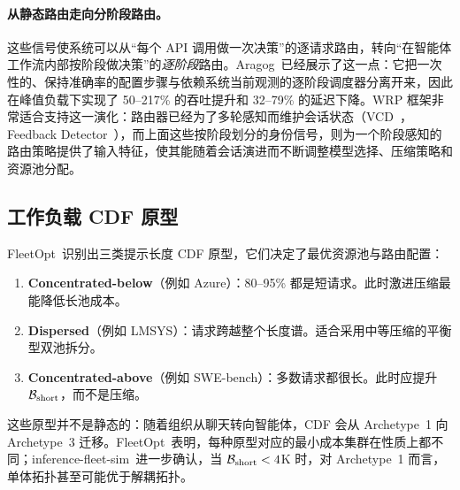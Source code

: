 \paragraph{从静态路由走向分阶段路由。}
这些信号使系统可以从“每个 API 调用做一次决策”的逐请求路由，转向“在智能体工作流内部按阶段做决策”的\emph{逐阶段}路由。Aragog~\cite{aragog2025}已经展示了这一点：它把一次性的、保持准确率的配置步骤与依赖系统当前观测的逐阶段调度器分离开来，因此在峰值负载下实现了 50--217\% 的吞吐提升和 32--79\% 的延迟下降。WRP 框架非常适合支持这一演化：路由器已经为了多轮感知而维护会话状态（VCD~\cite{vcd2026}，Feedback Detector~\cite{feedbackdet2026}），而上面这些按阶段划分的身份信号，则为一个阶段感知的路由策略提供了输入特征，使其能随着会话演进而不断调整模型选择、压缩策略和资源池分配。

\subsection{工作负载 CDF 原型}
\label{sec:workload:archetypes}

FleetOpt~\cite{fleetopt2026}识别出三类提示长度 CDF 原型，它们决定了最优资源池与路由配置：

\begin{enumerate}[nosep]
  \item \textbf{Concentrated-below}（例如 Azure）：80--95\% 都是短请求。此时激进压缩最能降低长池成本。
  \item \textbf{Dispersed}（例如 LMSYS）：请求跨越整个长度谱。适合采用中等压缩的平衡型双池拆分。
  \item \textbf{Concentrated-above}（例如 SWE-bench）：多数请求都很长。此时应提升 $\mathcal{B}_{\text{short}}$，而不是压缩。
\end{enumerate}

这些原型并不是静态的：随着组织从聊天转向智能体，CDF 会从 Archetype~1 向 Archetype~3 迁移。FleetOpt~\cite{fleetopt2026}表明，每种原型对应的最小成本集群在性质上都不同；inference-fleet-sim~\cite{fleetsim2026}进一步确认，当 $\mathcal{B}_{\text{short}} < 4$K 时，对 Archetype~1 而言，单体拓扑甚至可能优于解耦拓扑。
